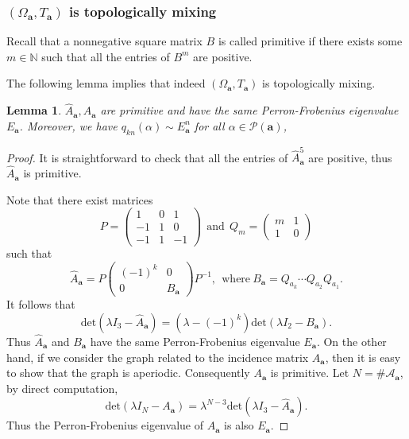 \documentclass[reqno,11pt,graphicx,]{amsart}
\numberwithin{equation}{section}
\theoremstyle{plain}
\newcommand{\N}{{\mathbb N}}
\newcommand{\3}{\mathbf{3}}
\newcommand{\ma}{\mathbf{a}}
\newtheorem{lemma}[theorem]{Lemma}
\begin{document}
	\subsubsection{$(\Omega_{\ma},T_{\ma})$ is topologically mixing}
	Recall that a nonnegative square matrix $B$ is called primitive if there exists some $m\in\N$ such that all the entries of $B^m$ are positive. 
	
	The following lemma implies that indeed $(\Omega_{\ma},T_{\ma})$ is topologically mixing.
	
	\begin{lemma}\label{primitive}
		$\hat{A}_{\ma},A_{\ma}$ are primitive and have the same Perron-Frobenius eigenvalue $E_{\ma}$. Moreover, we have $q_{kn}(\alpha)\sim E_{\ma}^n$ for all $\alpha\in\mathcal{P}(\ma)$, 
	\end{lemma}
	\begin{proof}
		It is straightforward to check that all the entries of $\hat{A}_{\ma}^5$ are positive,
		thus $\hat{A}_{\ma}$ is primitive. 
		
		Note that there exist matrices $$
		P=\left(\begin{array}{ccc}
			1&0&1\\
			-1&1&0\\ 
			-1&1&-1
		\end{array}\right)\ \ \text{and}\ \ Q_m=\left(%
		\begin{array}{cc}
			m & 1 \\ 
			1 & 0%
		\end{array}%
		\right)$$
		such that 
		\begin{equation*}
			\hat{A}_{\ma}=P\left(\begin{array}{cc}
				(-1)^k&0\\
				0&B_{\ma} 
			\end{array}\right)P^{-1},\ \  \text{where}\ B_{\mathbf{a}}=Q_{a_k}\cdots Q_{a_{2}}Q_{a_1}.
		\end{equation*}
		It follows that 
		$$\text{det}(\lambda I_3-\hat{A}_{\ma})=(\lambda-(-1)^k)\text{det}(\lambda I_2-B_{\ma}).$$
		Thus $\hat{A}_{\ma}$ and $B_{\ma}$ have the same Perron-Frobenius eigenvalue $E_{\ma}$. On the other hand, if we consider the graph related to the incidence matrix $A_{\ma}$, then it is easy to show that the graph is aperiodic. Consequently $A_{\ma}$ is primitive. Let $N=\#\mathscr{A}_{\ma}$, by direct computation,
		$$\text{det}(\lambda I_N-A_{\ma})=\lambda^{N-3}\text{det}(\lambda I_3-\hat{A}_{\ma}).$$
		Thus the Perron-Frobenius eigenvalue of $A_{\ma}$ is also $E_{\ma}$.
		

\end{proof}
\end{document}
